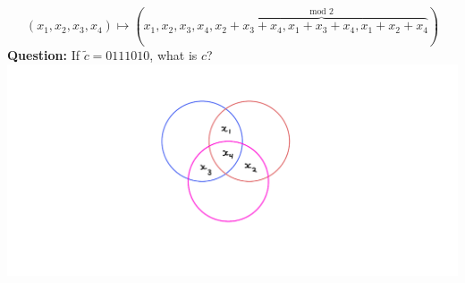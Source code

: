 \documentclass[aspectratio=169]{beamer}
\begin{document}
\begin{frame}{}
\[
(x_1, x_2, x_3, x_4) \mapsto (x_1, x_2, x_3, x_4, \overbrace{x_2 + x_3 + x_4, x_1 + x_3 + x_4, x_1 + x_2 + x_4}^{\text{mod }2})
\]
\textcolor{sigma@alertred}{\textbf{Question:}} If $\tilde{c} = 0111010$, what is $c$? \pause
    \includegraphics[width=\textwidth]{images/coding-01.png}
\end{frame}
\end{document}
